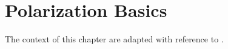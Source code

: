 \documentclass[oneside,a4,12p]{report} %
\begin{document}


\chapter{Polarization Basics}
The context of this chapter are adapted with reference to \cite{goldstein2003polarized}.





 
\end{document}
